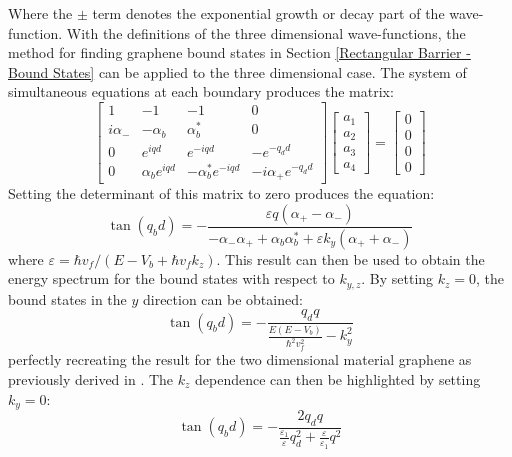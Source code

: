 			Where the $\pm$ term denotes the exponential growth or decay part of the wave-function. With the definitions of the three dimensional wave-functions, the method for finding graphene bound states in Section \ref{Rectangular Barrier - Bound States} can be applied to the three dimensional case. The system of simultaneous equations at each boundary produces the matrix: 
			\begin{equation}
				\left[\begin{array}{cccc}
					1&-1&-1&0\\
					i\alpha_{-}&-\alpha_{b}&\alpha_{b}^{*}&0\\
					0&e^{iqd}&e^{-iqd}&-e^{-q_{d}d}\\
					0&\alpha_{b} e^{iqd}&-\alpha_{b}^{*} e^{-iqd}&-i\alpha_{+}e^{-q_{d}d}
				\end{array}\right]
				\left[\begin{array}{cccc}
					a_{1}\\
					a_{2}\\
					a_{3}\\
					a_{4}
				\end{array}\right]=
				\left[\begin{array}{cccc}
					0\\
					0\\
					0\\
					0
				\end{array}\right]
			\end{equation}
			Setting the determinant of this matrix to zero produces the equation:
			\begin{equation}
				\tan(q_{b}d)=-\frac{\varepsilon q\left(\alpha_{+}-\alpha_{-}\right)}{-\alpha_{-}\alpha_{+}+\alpha_{b}\alpha_{b}^{*}+\varepsilon k_{y}\left(\alpha_{+}+\alpha_{-}\right)}
				\label{weyl-bound-combo}
			\end{equation}
			where $\varepsilon =\hbar v_{f}/\left(E-V_{b}+\hbar v_{f}k_{z}\right)$. This result can then be used to obtain the energy spectrum for the bound states with respect to $k_{y,z}$. By setting $k_{z}=0$, the bound states in the $y$ direction can be obtained:
			\begin{equation}
				\tan(q_{b}d)=-\frac{q_{d}q}{\frac{E\left(E-V_{b}\right)}{\hbar^{2}v_{f}^{2}}-k_{y}^{2}}
			\end{equation}
			perfectly recreating the result for the two dimensional material graphene as previously derived in \cite{b3}. The $k_{z}$ dependence can then be highlighted by setting $k_{y}=0$:
			\begin{equation}
				\tan(q_{b}d)=-\frac{2q_{d}q}{\frac{\varepsilon_{1}}{\varepsilon}q_{d}^{2}+\frac{\varepsilon}{\varepsilon_{1}}q^{2}}
			\end{equation}
